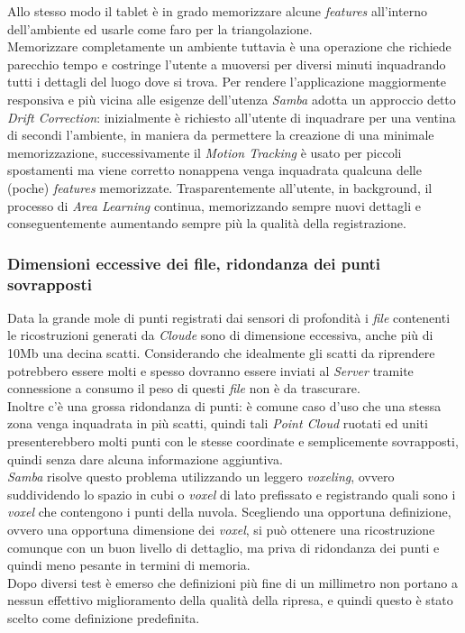 Allo stesso modo il tablet è in grado memorizzare alcune \emph{features} all'interno dell'ambiente ed usarle come faro per la triangolazione. \\
Memorizzare completamente un ambiente tuttavia è una operazione che richiede parecchio tempo e costringe l'utente a muoversi per diversi minuti inquadrando tutti i dettagli del luogo dove si trova. Per rendere l'applicazione maggiormente responsiva e più vicina alle esigenze dell'utenza \emph{Samba} adotta un approccio detto \emph{Drift Correction}: inizialmente è richiesto all'utente di inquadrare per una ventina di secondi l'ambiente, in maniera da permettere la creazione di una minimale memorizzazione, successivamente il \emph{Motion Tracking} è usato per piccoli spostamenti ma viene corretto nonappena venga inquadrata qualcuna delle (poche) \emph{features} memorizzate. Trasparentemente all'utente, in background, il processo di \emph{Area Learning} continua, memorizzando sempre nuovi dettagli e conseguentemente aumentando sempre più la qualità della registrazione.\\

\subsubsection{Dimensioni eccessive dei file, ridondanza dei punti sovrapposti}
Data la grande mole di punti registrati dai sensori di profondità i \emph{file} contenenti le ricostruzioni generati da \emph{Cloude} sono di dimensione eccessiva, anche più di 10Mb una decina scatti.
Considerando che idealmente gli scatti da riprendere potrebbero essere molti e spesso dovranno essere inviati al \emph{Server} tramite connessione a consumo il peso di questi \emph{file} non è da trascurare.\\
Inoltre c'è una grossa ridondanza di punti: è comune caso d'uso che una stessa zona venga inquadrata in più scatti, quindi tali \emph{Point Cloud} ruotati ed uniti presenterebbero molti punti con le stesse coordinate e semplicemente sovrapposti, quindi senza dare alcuna informazione aggiuntiva.\\
\emph{Samba} risolve questo problema utilizzando un leggero \emph{voxeling}, ovvero suddividendo lo spazio in cubi o \emph{voxel} di lato prefissato e registrando quali sono i \emph{voxel} che contengono i punti della nuvola.
Scegliendo una opportuna definizione, ovvero una opportuna dimensione dei \emph{voxel}, si può ottenere una ricostruzione comunque con un buon livello di dettaglio, ma priva di ridondanza dei punti e quindi meno pesante in termini di memoria.\\
Dopo diversi test è emerso che definizioni più fine di un millimetro non portano a nessun effettivo miglioramento della qualità della ripresa, e quindi questo è stato scelto come definizione predefinita.

